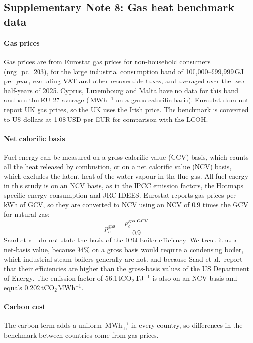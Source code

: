 \documentclass[11pt]{article}
\begin{document}
\subsection*{Supplementary Note 8: Gas heat benchmark data}
\paragraph*{Gas prices}
Gas prices are from Eurostat gas prices for non-household consumers (nrg\_pc\_203)\cite{eurostat_gasprices}, for the large industrial consumption band of 100,000--999,999\,GJ per year, excluding VAT and other recoverable taxes, and averaged over the two half-years of 2025. Cyprus, Luxembourg and Malta have no data for this band and use the EU-27 average (\,MWh$^{-1}$ on a gross calorific basis). Eurostat does not report UK gas prices, so the UK uses the Irish price. The benchmark is converted to US dollars at 1.08\,USD per EUR for comparison with the LCOH.

\paragraph*{Net calorific basis}
Fuel energy can be measured on a gross calorific value (GCV) basis, which counts all the heat released by combustion, or on a net calorific value (NCV) basis, which excludes the latent heat of the water vapour in the flue gas. All fuel energy in this study is on an NCV basis, as in the IPCC emission factors\cite{ipcc2006stationary}, the Hotmaps specific energy consumption\cite{hotmaps2018} and JRC-IDEES\cite{jrcidees2023}. Eurostat reports gas prices per kWh of GCV, so they are converted to NCV using an NCV of 0.9 times the GCV for natural gas\cite{ipcc2006intro}:
\begin{equation}
p^{\mathrm{gas}}_{c} = \frac{p^{\mathrm{gas,GCV}}_{c}}{0.9}
\end{equation}
Saad et al.\ do not state the basis of the 0.94 boiler efficiency\cite{saad2026}. We treat it as a net-basis value, because 94\% on a gross basis would require a condensing boiler, which industrial steam boilers generally are not, and because Saad et al.\ report that their efficiencies are higher than the gross-basis values of the US Department of Energy. The emission factor of 56.1\,tCO$_2$\,TJ$^{-1}$ is also on an NCV basis\cite{ipcc2006stationary} and equals 0.202\,tCO$_2$\,MWh$^{-1}$.

\paragraph*{Carbon cost}
The carbon term adds a uniform \,MWh$_{\mathrm{th}}^{-1}$ in every country, so differences in the benchmark between countries come from gas prices.
\end{document}
